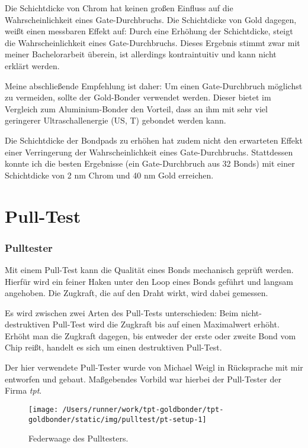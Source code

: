 \documentclass[
  paper=a4,
  ,captions=tableheading
]{scrartcl}
\begin{document}
Die Schichtdicke von Chrom hat keinen großen Einfluss auf die Wahrscheinlichkeit eines Gate-Durchbruchs. Die Schichtdicke von Gold dagegen, weißt einen messbaren Effekt auf: Durch eine Erhöhung der Schichtdicke, steigt die Wahrscheinlichkeit eines Gate-Durchbruchs. Dieses Ergebnis stimmt zwar mit meiner Bachelorarbeit überein, ist allerdings kontraintuitiv und kann nicht erklärt werden.

Meine abschließende Empfehlung ist daher: Um einen Gate-Durchbruch möglichst zu vermeiden, sollte der Gold-Bonder verwendet werden. Dieser bietet im Vergleich zum Aluminium-Bonder den Vorteil, dass an ihm mit sehr viel geringerer Ultraschallenergie (US, T) gebondet werden kann.

Die Schichtdicke der Bondpads zu erhöhen hat zudem nicht den erwarteten Effekt einer Verringerung der Wahrscheinlichkeit eines Gate-Durchbruchs. Stattdessen konnte ich die besten Ergebnisse (ein Gate-Durchbruch aus 32 Bonds) mit einer Schichtdicke von 2 nm Chrom und 40 nm Gold erreichen.

\hypertarget{pt}{%
\part{Pull-Test}\label{pt}}

\hypertarget{pt-pulltester}{%
\section{Pulltester}\label{pt-pulltester}}

Mit einem Pull-Test kann die Qualität eines Bonds mechanisch geprüft werden. Hierfür wird ein feiner Haken unter den Loop eines Bonds geführt und langsam angehoben. Die Zugkraft, die auf den Draht wirkt, wird dabei gemessen.

Es wird zwischen zwei Arten des Pull-Tests unterschieden: Beim nicht-destruktiven Pull-Test wird die Zugkraft bis auf einen Maximalwert erhöht. Erhöht man die Zugkraft dagegen, bis entweder der erste oder zweite Bond vom Chip reißt, handelt es sich um einen destruktiven Pull-Test.

Der hier verwendete Pull-Tester wurde von Michael Weigl in Rücksprache mit mir entworfen und gebaut. Maßgebendes Vorbild war hierbei der Pull-Tester der Firma \emph{tpt}.

\begin{figure}

{\centering \texttt{[image: /Users/runner/work/tpt-goldbonder/tpt-goldbonder/static/img/pulltest/pt-setup-1]} 

}

\caption{Federwaage des Pulltesters. }\label{fig:pt-setup-1}
\end{figure}
\end{document}
